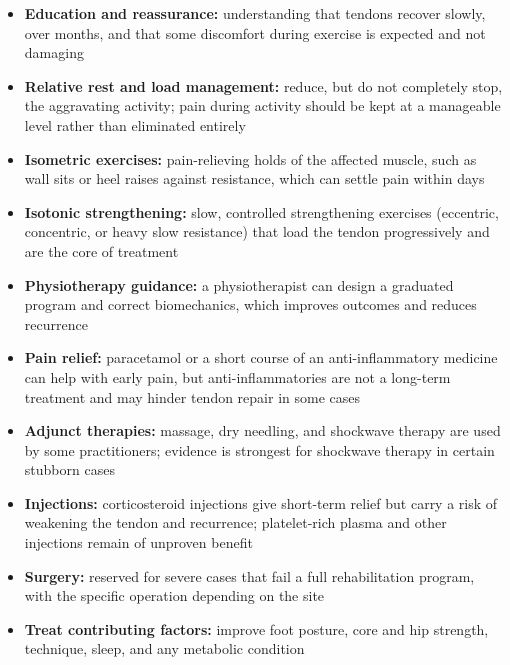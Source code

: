 \begin{itemize}
    \item \textbf{Education and reassurance:} understanding that tendons recover slowly, over months, and that some discomfort during exercise is expected and not damaging
    \item \textbf{Relative rest and load management:} reduce, but do not completely stop, the aggravating activity; pain during activity should be kept at a manageable level rather than eliminated entirely
    \item \textbf{Isometric exercises:} pain-relieving holds of the affected muscle, such as wall sits or heel raises against resistance, which can settle pain within days
    \item \textbf{Isotonic strengthening:} slow, controlled strengthening exercises (eccentric, concentric, or heavy slow resistance) that load the tendon progressively and are the core of treatment
    \item \textbf{Physiotherapy guidance:} a physiotherapist can design a graduated program and correct biomechanics, which improves outcomes and reduces recurrence
    \item \textbf{Pain relief:} paracetamol or a short course of an anti-inflammatory medicine can help with early pain, but anti-inflammatories are not a long-term treatment and may hinder tendon repair in some cases
    \item \textbf{Adjunct therapies:} massage, dry needling, and shockwave therapy are used by some practitioners; evidence is strongest for shockwave therapy in certain stubborn cases
    \item \textbf{Injections:} corticosteroid injections give short-term relief but carry a risk of weakening the tendon and recurrence; platelet-rich plasma and other injections remain of unproven benefit
    \item \textbf{Surgery:} reserved for severe cases that fail a full rehabilitation program, with the specific operation depending on the site
    \item \textbf{Treat contributing factors:} improve foot posture, core and hip strength, technique, sleep, and any metabolic condition
\end{itemize}

